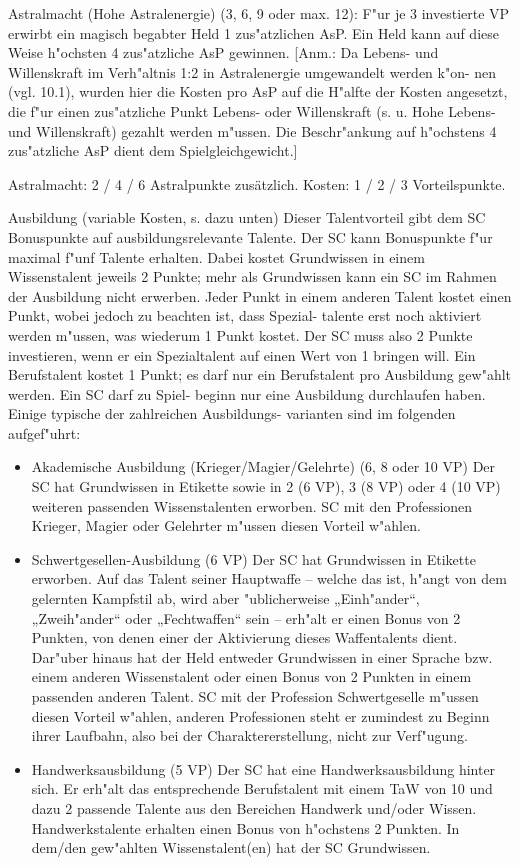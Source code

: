 \begin{description}
\item{Astralmacht (Hohe Astralenergie) (3, 6, 9 oder max. 12):}
F"ur je 3 investierte VP erwirbt ein magisch begabter Held 1 zus"atzlichen AsP. Ein Held kann auf diese Weise h"ochsten 4 zus"atzliche AsP gewinnen. [Anm.: Da Lebens- und Willenskraft im Verh"altnis 1:2 in Astralenergie umgewandelt werden k"on- nen (vgl. 10.1), wurden hier die Kosten pro AsP auf die H"alfte der Kosten angesetzt, die f"ur einen zus"atzliche Punkt Lebens- oder Willenskraft (s. u. Hohe Lebens- und Willenskraft) gezahlt werden m"ussen. Die Beschr"ankung auf h"ochstens 4 zus"atzliche AsP dient dem Spielgleichgewicht.]

\item{Astralmacht:} 2 / 4 / 6 Astralpunkte zusätzlich. Kosten: 1 / 2 / 3 Vorteilspunkte.

\item{Ausbildung (variable Kosten, s. dazu unten)}
Dieser Talentvorteil gibt dem SC Bonuspunkte auf ausbildungsrelevante Talente. Der SC kann Bonuspunkte f"ur maximal f"unf Talente erhalten. Dabei kostet Grundwissen in einem Wissenstalent jeweils 2 Punkte; mehr als Grundwissen kann ein SC im Rahmen der Ausbildung nicht erwerben. Jeder Punkt in einem anderen Talent kostet einen Punkt, wobei jedoch zu beachten ist, dass Spezial- talente erst noch aktiviert werden m"ussen, was wiederum 1 Punkt kostet. Der SC muss also 2 Punkte investieren, wenn er ein Spezialtalent auf einen Wert von 1 bringen will. Ein Berufstalent kostet 1 Punkt; es darf nur ein Berufstalent pro Ausbildung gew"ahlt werden. Ein SC darf zu Spiel- beginn nur eine Ausbildung durchlaufen haben. Einige typische der zahlreichen Ausbildungs- varianten sind im folgenden aufgef"uhrt:
\begin{itemize}
\item   Akademische Ausbildung (Krieger/Magier/Gelehrte) (6, 8 oder 10 VP) Der SC hat Grundwissen in Etikette sowie in 2 (6 VP), 3 (8 VP) oder 4 (10 VP) weiteren passenden Wissenstalenten erworben. SC mit den Professionen Krieger, Magier oder Gelehrter m"ussen diesen Vorteil w"ahlen.
\item   Schwertgesellen-Ausbildung (6 VP) Der SC hat Grundwissen in Etikette erworben. Auf das Talent seiner Hauptwaffe – welche das ist, h"angt von dem gelernten Kampfstil ab, wird aber "ublicherweise „Einh"ander“, „Zweih"ander“ oder „Fechtwaffen“ sein – erh"alt er einen Bonus von 2 Punkten, von denen einer der
Aktivierung dieses Waffentalents dient. Dar"uber hinaus hat der Held entweder Grundwissen in einer Sprache bzw. einem anderen Wissenstalent oder einen Bonus von 2 Punkten in einem passenden anderen Talent. SC mit der Profession Schwertgeselle m"ussen diesen Vorteil w"ahlen, anderen Professionen steht er zumindest zu Beginn ihrer Laufbahn, also bei der Charaktererstellung, nicht zur Verf"ugung.
\item   Handwerksausbildung (5 VP) Der SC hat eine Handwerksausbildung hinter sich. Er erh"alt das entsprechende Berufstalent mit einem TaW von 10 und dazu 2 passende Talente aus den Bereichen Handwerk und/oder Wissen. Handwerkstalente erhalten einen Bonus von h"ochstens 2 Punkten. In dem/den gew"ahlten Wissenstalent(en) hat der SC Grundwissen.
\end{itemize}


\end{description}

